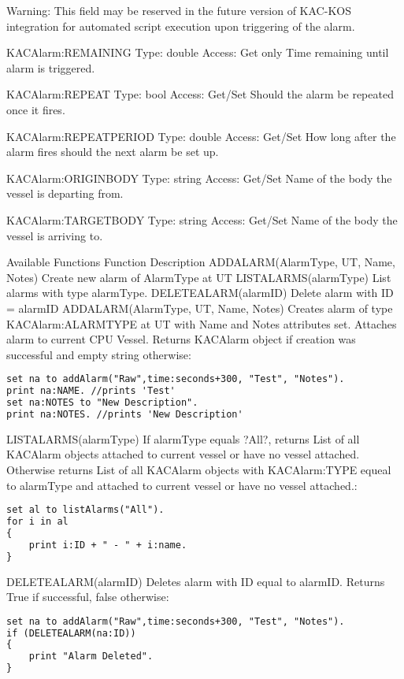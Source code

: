 Warning: This field may be reserved in the future version of KAC-KOS integration for automated script execution upon triggering of the alarm.

KACAlarm:REMAINING
Type:	double
Access:	Get only
Time remaining until alarm is triggered.

KACAlarm:REPEAT
Type:	bool
Access:	Get/Set
Should the alarm be repeated once it fires.

KACAlarm:REPEATPERIOD
Type:	double
Access:	Get/Set
How long after the alarm fires should the next alarm be set up.

KACAlarm:ORIGINBODY
Type:	string
Access:	Get/Set
Name of the body the vessel is departing from.

KACAlarm:TARGETBODY
Type:	string
Access:	Get/Set
Name of the body the vessel is arriving to.

Available Functions
Function	Description
ADDALARM(AlarmType, UT, Name, Notes)	Create new alarm of AlarmType at UT
LISTALARMS(alarmType)	List alarms with type alarmType.
DELETEALARM(alarmID)	Delete alarm with ID = alarmID
ADDALARM(AlarmType, UT, Name, Notes)
Creates alarm of type KACAlarm:ALARMTYPE at UT with Name and Notes attributes set. Attaches alarm to current CPU Vessel. Returns KACAlarm object if creation was successful and empty string otherwise:

\begin{lstlisting}[frame=single,language=XML]
set na to addAlarm("Raw",time:seconds+300, "Test", "Notes").
print na:NAME. //prints 'Test'
set na:NOTES to "New Description".
print na:NOTES. //prints 'New Description'
\end{lstlisting}

LISTALARMS(alarmType)
If alarmType equals ?All?, returns List of all KACAlarm objects attached to current vessel or have no vessel attached. Otherwise returns List of all KACAlarm objects with KACAlarm:TYPE equeal to alarmType and attached to current vessel or have no vessel attached.:

\begin{lstlisting}[frame=single,language=XML]
set al to listAlarms("All").
for i in al
{
    print i:ID + " - " + i:name.
}
\end{lstlisting}

DELETEALARM(alarmID)
Deletes alarm with ID equal to alarmID. Returns True if successful, false otherwise:

\begin{lstlisting}[frame=single,language=XML]
set na to addAlarm("Raw",time:seconds+300, "Test", "Notes").
if (DELETEALARM(na:ID))
{
    print "Alarm Deleted".
}
\end{lstlisting}
